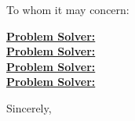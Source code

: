 \documentclass[10pt,a4paper]{letter}
\begin{document}
\begin{letter}{}
\opening{To whom it may concern:}

\underline{\textbf{Problem Solver:}}\\

\underline{\textbf{Problem Solver:}}\\

\underline{\textbf{Problem Solver:}}\\

\underline{\textbf{Problem Solver:}}\\
   

\closing{Sincerely,}

\end{letter}
\end{document}
